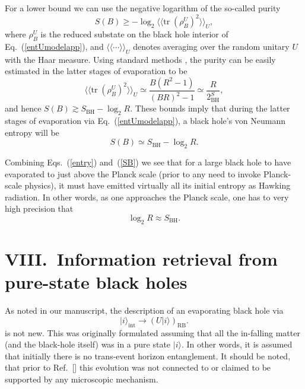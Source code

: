 \documentclass[twocolumn,aps,showpacs,prl]{revtex4}
\begin{document}
For a lower bound we can use the negative logarithm of the so-called purity
\begin{equation}
S(B)\geq -\log_2 \langle\!\langle 
{\text{tr}}\; (\rho_B^U)^2 \rangle\!\rangle_U,
\end{equation}
where $\rho_B^U$ is the reduced substate on the black hole interior
of Eq.~(\ref{entUmodelapp}), and
$\langle\!\langle \cdots \rangle\!\rangle_U$ denotes averaging over
the random unitary $U$ with the Haar measure. Using standard methods 
\cite{Abey06app}, the purity can be easily estimated in the latter stages
of evaporation to be
\begin{equation}
\langle\!\langle
{\text{tr}}\; (\rho_B^U)^2 \rangle\!\rangle_U
\simeq \frac{B(R^2-1)}{(BR)^2-1} \simeq \frac{R}{2^S_{\text{BH}}},
\end{equation}
and hence $S(B)\gtrsim S_{\text{BH}} -\log_2 R$. These bounds
imply that during the latter stages of evaporation via
Eq.~(\ref{entUmodelapp}), a black hole's von Neumann entropy will be
\begin{equation}
S(B)\simeq S_{\text{BH}} -\log_2 R.
\label{SB}
\end{equation}

Combining Eqs.~(\ref{entry}) and~(\ref{SB}) we see that for a large
black hole to have evaporated to just above the Planck scale 
(prior to any need to invoke Planck-scale physics), it must have emitted
virtually all its initial entropy as Hawking radiation. In other words,
as one approaches the Planck scale, one has to very high precision
that
\begin{equation}
\log_2 R \approx S_{\text{BH}}.
\end{equation}

\section{VIII.\ Information retrieval from pure-state black holes}

As noted in our manuscript, the description of an evaporating
black hole via
\begin{equation}
|i\rangle_{\text{int}}\rightarrow (U|i\rangle)_{\text{RB}}. \label{Umodelapp}
\end{equation}
is not new. This was originally formulated \cite{Page93app}
assuming that all the in-falling matter (and the black-hole itself)
was in a pure state $|i\rangle$. In other words, it is assumed that
initially there is no trans-event horizon entanglement. It should be
noted, that prior to Ref.~[] this evolution was not
connected to or claimed to be supported by any microscopic mechanism.
\end{document}
